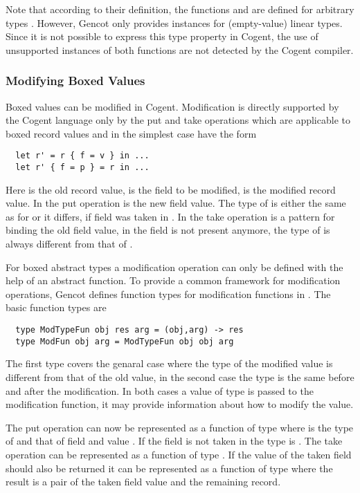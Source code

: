 Note that according to their definition, the functions  and  are defined for arbitrary
types . However, Gencot only provides instances for (empty-value) linear types. Since it is not possible
to express this type property in Cogent, the use of unsupported instances of both functions are not detected by the 
Cogent compiler.

\subsubsection{Modifying Boxed Values}

Boxed values can be modified in Cogent. Modification is directly supported by the Cogent language only by the put
and take operations which are applicable to boxed record values and in the simplest case have the form
\begin{verbatim}
  let r' = r { f = v } in ...
  let r' { f = p } = r in ...
\end{verbatim}
Here  is the old record value,  is the field to be modified,  is the modified record value.
In the put operation  is the new field value. The type of  is either the same as for  or it
differs, if field  was taken in . In the take operation  is a pattern for binding the old 
field value, in  the field is not present anymore, the type of  is always different from that of .

For boxed abstract types a modification operation can only be defined with the help of an abstract function.
To provide a common framework for modification operations, Gencot defines function types for modification functions 
in . The basic function types are
\begin{verbatim}
  type ModTypeFun obj res arg = (obj,arg) -> res
  type ModFun obj arg = ModTypeFun obj obj arg
\end{verbatim}
The first type covers the genaral case where the type of the modified value is different from that of the old value, in the second
case the type is the same before and after the modification. In both cases a value of type  is passed to the modification
function, it may provide information about how to modify the value. 

The put operation can now be represented as a function of type  where  is the type of
 and  that of field  and value . If the field is not taken in  the type is .
The take operation can be represented as a function of type . If the value of the taken
field should also be returned it can be represented as a function of type  where the result
is a pair of the taken field value and the remaining record.

